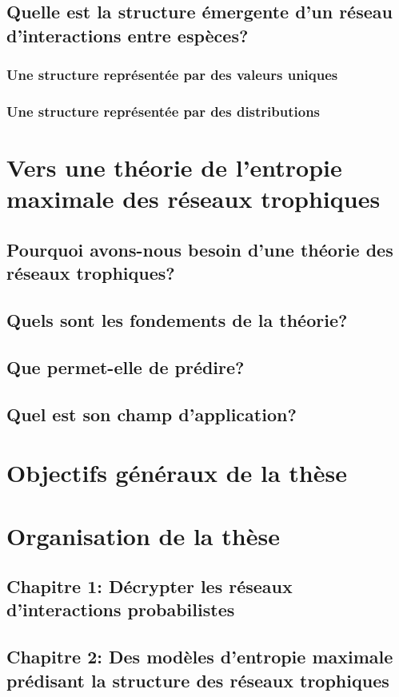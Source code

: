 \subsection{Quelle est la structure émergente d'un réseau d'interactions entre espèces?} 

\subsubsection{Une structure représentée par des valeurs uniques} 

\subsubsection{Une structure représentée par des distributions} 



\section{Vers une théorie de l'entropie maximale des réseaux trophiques}

\subsection{Pourquoi avons-nous besoin d'une théorie des réseaux trophiques?} 

\subsection{Quels sont les fondements de la théorie?} 

\subsection{Que permet-elle de prédire?} 

\subsection{Quel est son champ d'application?} 



\section{Objectifs généraux de la thèse} 



\section{Organisation de la thèse}

\subsection{Chapitre 1: Décrypter les réseaux d'interactions probabilistes} 

\subsection{Chapitre 2: Des modèles d'entropie maximale prédisant la structure des réseaux trophiques} 

\endinput
